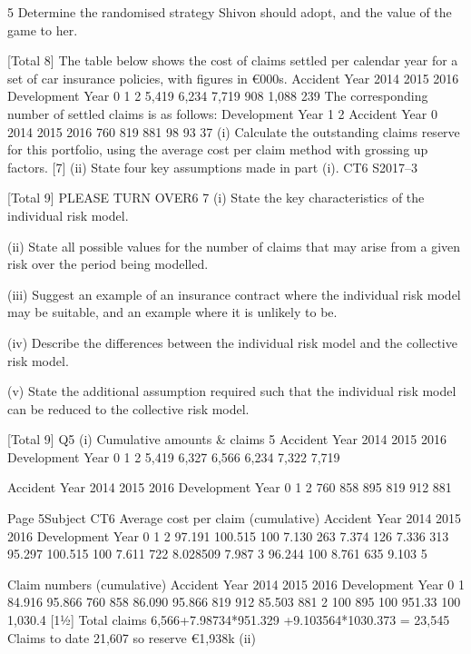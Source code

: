 \documentclass[a4paper,12pt]{article}
\begin{document}
\begin{enumerate}
5
Determine the randomised strategy Shivon should adopt, and the value of the
game to her.

[Total 8]
The table below shows the cost of claims settled per calendar year for a set of car
insurance policies, with figures in €000s.
Accident Year
2014
2015
2016
Development Year
0
1
2
5,419
6,234
7,719
908
1,088
239
The corresponding number of settled claims is as follows:
Development Year
1
2
Accident Year 0
2014
2015
2016 760
819
881
98
93
37
(i) Calculate the outstanding claims reserve for this portfolio, using the average
cost per claim method with grossing up factors.
[7]
(ii) State four key assumptions made in part (i).
CT6 S2017–3

[Total 9]
PLEASE TURN OVER6
7
(i) State the key characteristics of the individual risk model.

(ii) State all possible values for the number of claims that may arise from a given
risk over the period being modelled.

(iii) Suggest an example of an insurance contract where the individual risk model
may be suitable, and an example where it is unlikely to be.

(iv) Describe the differences between the individual risk model and the collective
risk model.

(v) State the additional assumption required such that the individual risk model
can be reduced to the collective risk model.

[Total 9]
Q5
(i)
Cumulative amounts & claims
5
Accident Year
2014
2015
2016
Development Year
0
1
2
5,419 6,327 6,566
6,234 7,322
7,719

Accident Year
2014
2015
2016
Development Year
0
1
2
760
858
895
819
912
881

Page 5Subject CT6 %
Average cost per claim (cumulative)
Accident Year
2014
2015
2016
Development Year
0
1
2
97.191%
100.515%
100%
7.130 263
7.374 126
7.336 313
95.297%
100.515%
100%
7.611 722
8.028509
7.987 3
96.244%
100%
8.761 635
9.103 5

Claim numbers (cumulative)
Accident Year
2014
2015
2016
Development Year
0
1
84.916%
95.866%
760
858
86.090%
95.866%
819
912
85.503%
881
2
100%
895
100%
951.33
100%
1,030.4
[11⁄2]
Total claims 6,566+7.98734*951.329 +9.103564*1030.373 = 23,545
Claims to date 21,607 so reserve €1,938k
(ii)



\end{enumerate}
\end{document}
